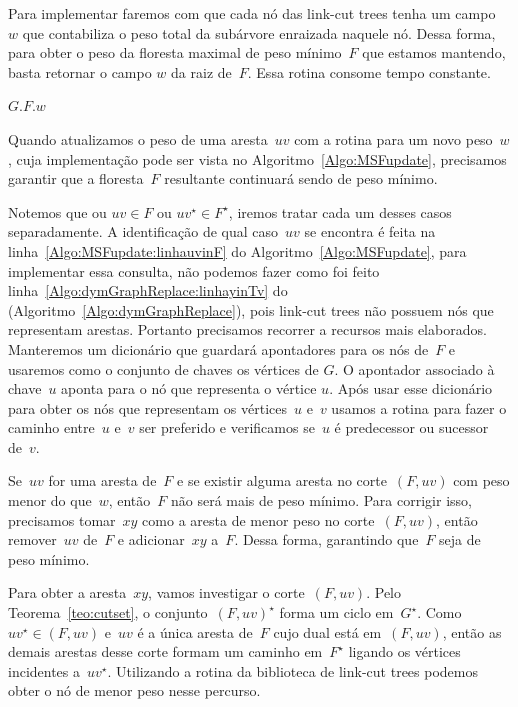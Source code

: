 Para implementar \MSFweight{} faremos com que cada nó das link-cut trees tenha um campo~$w$ que contabiliza o peso total da subárvore enraizada naquele nó.
Dessa forma, para obter o peso da floresta maximal de peso mínimo~$F$ que estamos mantendo, basta retornar o campo $w$ da raiz de~$F$.
Essa rotina consome tempo constante.

\begin{algorithm}[htb]
\caption{\MSFweight($G$)}
\label{Algo:MSFweight}
\begin{algorithmic}[1]
\State \Return $G$.$F$.$w$
\end{algorithmic}
\end{algorithm}

Quando atualizamos o peso de uma aresta~$uv$ com a rotina \MSFupdate{} para um novo peso~$w$, cuja implementação pode ser vista no Algoritmo~\ref{Algo:MSFupdate}, precisamos garantir que a floresta~$F$ resultante continuará sendo  de peso mínimo.

Notemos que ou $uv\in F$ ou $uv^\star\in F^\star$, iremos tratar cada um desses casos separadamente.
A identificação de qual caso~$uv$ se encontra é feita na linha~\ref{Algo:MSFupdate:linhauvinF} do Algoritmo~\ref{Algo:MSFupdate}, para implementar essa consulta, não podemos fazer como foi feito linha~\ref{Algo:dymGraphReplace:linhayinTv} do \dymGraphReplace(Algoritmo~\ref{Algo:dymGraphReplace}), pois link-cut trees não possuem nós que representam arestas.
Portanto precisamos recorrer a recursos mais elaborados.
Manteremos um dicionário que guardará apontadores para os nós de~$F$ e usaremos como o conjunto de chaves os vértices de $G$. O apontador associado à chave~$u$ aponta para o nó que representa o vértice $u$.
Após usar esse dicionário para obter os nós que representam os vértices~$u$ e~$v$ usamos a rotina \linkcutPath{} para fazer o caminho entre~$u$ e~$v$ ser preferido e verificamos se~$u$ é predecessor ou sucessor de~$v$.

Se~$uv$ for uma aresta de~$F$ e se existir alguma aresta no corte~$(F, uv)$ com peso menor do que~$w$, então~$F$ não será mais de peso mínimo.
Para corrigir isso, precisamos tomar~$xy$ como a aresta de menor peso no corte~$(F, uv)$,
então remover~$uv$ de~$F$ e adicionar~$xy$ a~$F$.
Dessa forma, garantindo que~$F$ seja de peso mínimo.

Para obter a aresta~$xy$, vamos investigar o corte~$(F, uv)$.
Pelo Teorema~\ref{teo:cutset}, o conjunto~$(F, uv)^\star$ forma um ciclo em~$G^\star$.
Como~$uv^\star\in(F, uv)$ e~$uv$ é a única aresta de~$F$ cujo dual está em~$(F, uv)$, então as demais arestas desse corte formam um caminho em~$F^\star$ ligando os vértices incidentes a~$uv^\star$.
Utilizando a rotina \linkcutMin{}  da biblioteca de link-cut trees podemos obter o nó de menor peso nesse percurso.

